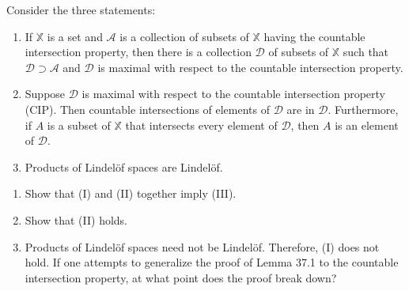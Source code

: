\documentclass[a4paper,12pt, reqno]{article}
\theoremstyle{definition}
\newenvironment{exerr}[1]{
  \renewcommand\theexeralt{#1}
  \exeralt
}{\endexeralt}
\newcommand{\A}{\mathscr{A}}
\newcommand{\D}{\mathscr{D}}
\newcommand{\X}{\mathbb{X}}
\begin{document}
\begin{exerr}{3}
  Consider the three statements:
  \begin{enumerate}[label = (\Roman*)]
    \item If $\X$ is a set and $\A$ is a collection of subsets of $\X$ having the countable intersection property, then there is a collection $\D$ of subsets of $\X$ such that $\D\supset\A$ and $\D$ is maximal with respect to the countable intersection property.
    \item Suppose $\D$ is maximal with respect to the countable intersection property (CIP). Then countable intersections of elements of $\D$ are in $\D$. Furthermore, if $A$ is a subset of $\X$ that intersects every element of $\D$, then $A$ is an element of $\D$.
    \item Products of Lindelöf spaces are Lindelöf.
  \end{enumerate}
  \begin{enumerate}[label=(\alph*)]
    \item Show that (I) and (II) together imply (III).
    \item Show that (II) holds.
    \item Products of Lindelöf spaces need not be Lindelöf. Therefore, (I) does not hold. If one attempts to generalize the proof of Lemma 37.1 to the countable intersection property, at what point does the proof break down?
  \end{enumerate}
\end{exerr}
\end{document}
